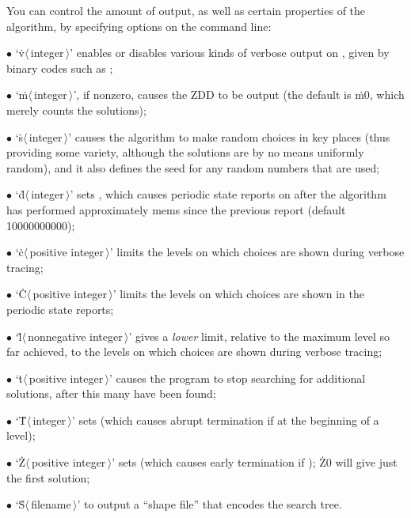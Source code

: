 You can control the amount of output, as well as certain properties
of the algorithm, by specifying options on the command line:
\smallskip\item{$\bullet$}
`\.v$\langle\,$integer$\,\rangle$' enables or disables various kinds of verbose
output on , given by binary codes such as ;
\item{$\bullet$}
`\.m$\langle\,$integer$\,\rangle$', if nonzero, causes the ZDD
to be output (the default is \.{m0}, which merely counts the solutions);
\item{$\bullet$}
`\.s$\langle\,$integer$\,\rangle$' causes the algorithm to make
random choices in key places (thus providing some variety, although
the solutions are by no means uniformly random), and it also
defines the seed for any random numbers that are used;
\item{$\bullet$}
`\.d$\langle\,$integer$\,\rangle$' sets , which causes periodic
state reports on  after the algorithm has performed
approximately
 mems since the previous report (default 10000000000);
\item{$\bullet$}
`\.c$\langle\,$positive integer$\,\rangle$' limits the levels on which
choices are shown during verbose tracing;
\item{$\bullet$}
`\.C$\langle\,$positive integer$\,\rangle$' limits the levels on which
choices are shown in the periodic state reports;
\item{$\bullet$}
`\.l$\langle\,$nonnegative integer$\,\rangle$' gives a {\it lower\/} limit,
relative to the maximum level so far achieved, to the levels on which
choices are shown during verbose tracing;
\item{$\bullet$}
`\.t$\langle\,$positive integer$\,\rangle$' causes the program to
stop searching for additional solutions, after this many have been found;
\item{$\bullet$}
`\.T$\langle\,$integer$\,\rangle$' sets  (which causes abrupt
termination if  at the beginning of a level);
\item{$\bullet$}
`\.Z$\langle\,$positive integer$\,\rangle$' sets  (which causes
early
termination if ); \.{Z0} will give just the first
solution;
\item{$\bullet$}
`\.S$\langle\,$filename$\,\rangle$' to output a ``shape file'' that encodes
the search tree.

